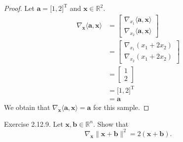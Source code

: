 \documentclass{article}
\theoremstyle{plain}
\begin{document}
\begin{proof}
	Let
	\begin{math}
		\bm{a} = \lbrack 1 , 2 \rbrack^{\mathrm{T}}
	\end{math}
	and
	\begin{math}
		\bm{x} \in \mathbb{R}^2 .
	\end{math}
	\begin{equation*}
		\begin{split}
			\nabla_{\bm{x}} \langle \bm{a} , \bm{x} \rangle &=
			\begin{bmatrix}
				\nabla_{x_1} \langle \bm{a} , \bm{x} \rangle \\
				\nabla_{x_2} \langle \bm{a} , \bm{x} \rangle
			\end{bmatrix} \\
			&=
			\begin{bmatrix}
				\nabla_{x_1} (x_1 + 2 x_2) \\
				\nabla_{x_2} (x_1 + 2 x_2)
			\end{bmatrix} \\
			&=
			\begin{bmatrix}
				1 \\
				2
			\end{bmatrix} \\
			&= \lbrack 1 , 2 \rbrack^{\mathrm{T}} \\
			&= \bm{a}
		\end{split}
	\end{equation*}
	We obtain that $\nabla_{\bm{x}} \langle \bm{a} , \bm{x} \rangle = \bm{a}$ for this sample.
\end{proof}


\begin{itembox}[l]{Exercise 2.12.9.}
	Let
	\begin{math}
		\bm{x} , \bm{b} \in \mathbb{R}^n .
	\end{math}
	Show that
	\begin{equation*}
		\nabla_{\bm{x}} \lVert \bm{x} + \bm{b} \rVert^2 = 2 (\bm{x} + \bm{b}) .
	\end{equation*}
\end{itembox}
\end{document}
